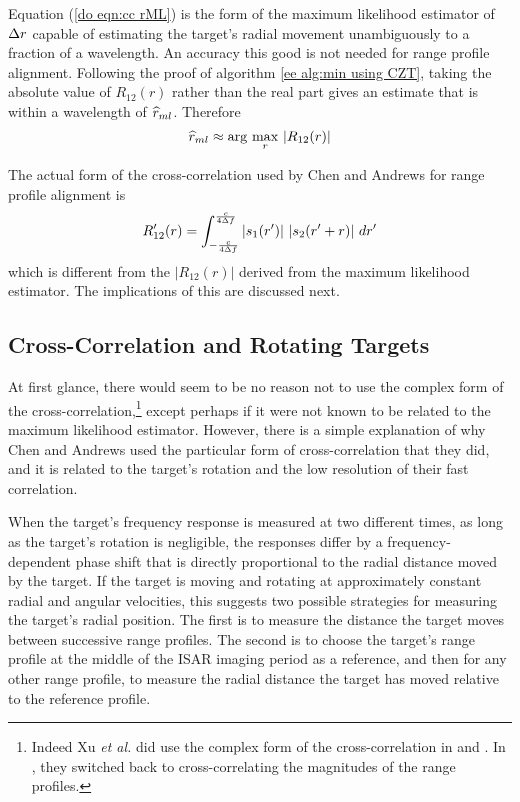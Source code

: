 Equation (\ref{do eqn:cc rML}) is the form of the maximum likelihood
estimator of ${\Delta r}$ capable of estimating the target's radial movement
unambiguously to a fraction of a wavelength.  An accuracy this good is not
needed for range profile alignment.  Following the proof of algorithm
\ref{ee alg:min using CZT}, taking the absolute value of $R_{12}(r)$ rather
than the real part gives an estimate that is within a wavelength of 
$\widehat{r}_{ml}$.  Therefore
\begin{equation}
\widehat{r}_{ml}\approx\arg\,\max_{{r}}\,\left|R_{12}(r)\right|
\end{equation}

The actual form of the cross-correlation used by Chen and Andrews 
for range profile alignment is
\begin{equation}
R'_{12}(r)=\int_{-\frac{c}{4{\Delta f}}}^{\frac{c}{4{\Delta f}}}
\left|s_1(r')\right|\,\left|s_2(r'+r)\right|\,dr'
\label{do eqn:R'12(r)}
\end{equation}
which is different from the $\left|R_{12}(r)\right|$ derived from the maximum
likelihood estimator.  The implications of this are discussed next.

\subsection{Cross-Correlation and Rotating Targets}

At first glance, there would seem to be no reason not to use the complex 
form of the cross-correlation,\footnote{Indeed Xu {\em et al.\/} did use
the complex form of the cross-correlation in \protect\cite{Xu89} and
\protect\cite{Xu90b}.  In \protect\cite{Xu90a}, they switched back to
cross-correlating the magnitudes of the range profiles.} except perhaps if
it were not known to be related to the maximum likelihood estimator. 
However, there is a simple explanation of why Chen and Andrews used the
particular form of cross-correlation that they did, and it is related to
the target's rotation and the low resolution of their fast correlation.

When the target's frequency response is measured at two different times, as
long as the target's rotation is negligible, the responses differ by a
frequency-dependent phase shift that is directly proportional to the radial
distance moved by the target.  If the target is moving and rotating at
approximately constant radial and angular velocities, this suggests two
possible strategies for measuring the target's radial position.  The first
is to measure the distance the target moves between successive range 
profiles.  The second is to choose the target's range profile at the middle
of the ISAR imaging period as a reference, and then for any other range
profile, to measure the radial distance the target has moved relative to
the reference profile.

